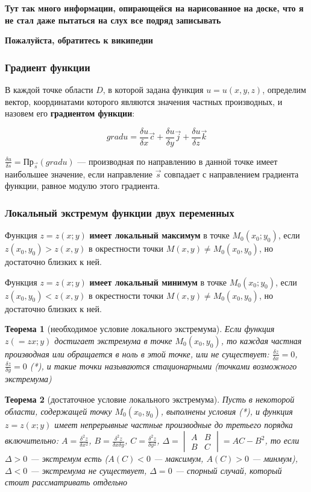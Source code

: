 \documentclass{article}
\newtheorem{theorem}{Теорема}
\begin{document}
\begin{flushleft}
\textbf{Тут так много информации, опирающейся на нарисованное на доске, что я не стал даже пытаться на слух все подряд записывать}

\textbf{Пожалуйста, обратитесь к википедии}

\subsubsection{Градиент функции}

В каждой точке области $D$, в которой задана функция $u = u(x, y, z)$, определим вектор, координатами которого являются значения частных производных, и назовем его \textbf{градиентом функции}:

$$grad u = \frac{\delta u}{\delta x} \overrightarrow{c} + \frac{\delta u}{\delta y} \overrightarrow{j} + \frac{\delta u}{\delta z} \overrightarrow{k} $$

$\frac{\delta u}{\delta s} = \text{Пр}_{\overrightarrow{s}} (grad u)$ — производная по направлению в данной точке имеет наибольшее значение, если направление $\overrightarrow{s}$ совпадает с направлением градиента функции, равное модулю этого градиента.

\subsubsection{Локальный экстремум функции двух переменных}

Функция $z = z(x; y)$ \textbf{имеет локальный максимум} в точке $M_0(x_0; y_0)$, если $z(x_0, y_0) > z(x, y)$ в окрестности точки $M(x, y) \ne M_0(x_0, y_0)$, но достаточно близких к ней.

Функция $z = z(x; y)$ \textbf{имеет локальный минимум} в точке $M_0(x_0; y_0)$, если $z(x_0, y_0) < z(x, y)$ в окрестности точки $M(x, y) \ne M_0(x_0, y_0)$, но достаточно близких к ней.

\begin{theorem}[необходимое условие локального экстремума]
    Если функция $z( = zx; y)$ достигает экстремума в точке $M_0(x_0, y_0)$, то каждая частная производная или обращается в ноль в этой точке, или не существует: $\frac{\delta z}{\delta x} = 0$, $\frac{\delta z}{\delta y} = 0$ (*), и такие точки называются стационарными (точками возможного экстремума)
\end{theorem}

\begin{theorem}[достаточное условие локального экстремума]
    Пусть в некоторой области, содержащей точку $M_0(x_0, y_0)$, выполнены условия (*), и функция $z = z(x; y)$ имеет непрерывные частные производные до третьего порядка включительно: $A = \frac{\delta^2 z}{\delta x^2}$, $B = \frac{\delta^2 z}{\delta x \delta y}$, $C = \frac{\delta^2 z}{\delta y^2}$, $\Delta = \begin{vmatrix}
        A & B \\
        B & C
    \end{vmatrix} = AC - B^2$, то если $\Delta > 0$ — экстремум есть ($A(C) < 0$ — максимум, $A(C) > 0$ — минмум), $\Delta < 0$ — экстремума не существует, $\Delta = 0$ — спорный случай, который стоит рассматривать отдельно
\end{theorem}

\end{flushleft}
\end{document}
